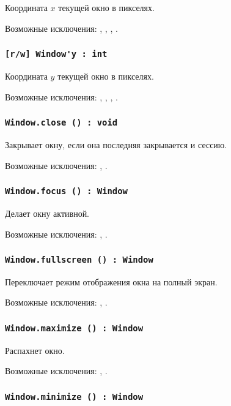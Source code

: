 Координата $x$ текущей окно в пикселях.

Возможные исключения: , , , .

\subsubsection{\lstinline|[r/w] Window'y : int|}

Координата $y$ текущей окно в пикселях.

Возможные исключения: , , , .

\subsubsection{\lstinline|Window.close () : void|}

Закрывает окну, если она последняя закрывается и сессию.

Возможные исключения: , .

\subsubsection{\lstinline|Window.focus () : Window|}

Делает окну активной.

Возможные исключения: , .

\subsubsection{\lstinline|Window.fullscreen () : Window|}

Переключает режим отображения окна на полный экран.

Возможные исключения: , .

\subsubsection{\lstinline|Window.maximize () : Window|}

Распахнет окно.

Возможные исключения: , .

\subsubsection{\lstinline|Window.minimize () : Window|}

